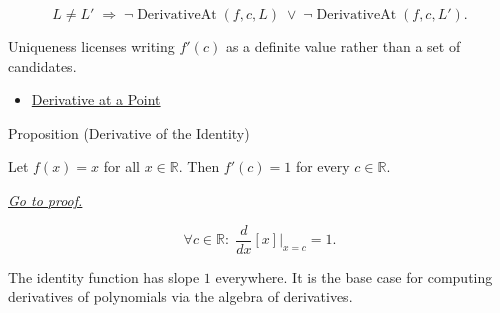 \begin{remark*}
\[
L \neq L'
\;\Longrightarrow\;
\neg\operatorname{DerivativeAt}(f,c,L)
\;\lor\;
\neg\operatorname{DerivativeAt}(f,c,L').
\]
\end{remark*}

\begin{remark*}[Interpretation]
Uniqueness licenses writing $f'(c)$ as a definite value rather than a set of candidates.
\end{remark*}

\begin{dependencies}
\begin{itemize}
  \item \hyperref[def:derivative-at-a-point]{Derivative at a Point}
\end{itemize}
\end{dependencies}


\begin{propositionbox}{Proposition (Derivative of the Identity)}
\begin{proposition}
\label{prop:derivative-of-the-identity}
Let $f(x) = x$ for all $x \in \mathbb{R}$. Then $f'(c) = 1$ for every $c \in \mathbb{R}$.

\smallskip\noindent
\hyperref[prf:derivative-of-the-identity]{\textit{Go to proof.}}
\end{proposition}
\end{propositionbox}

\begin{remark*}
\[
\forall c \in \mathbb{R}:\; \frac{d}{dx}[x]\big|_{x=c} = 1.
\]
\end{remark*}

\begin{remark*}[Interpretation]
The identity function has slope $1$ everywhere. It is the base case for computing derivatives of polynomials via the algebra of derivatives.
\end{remark*}

\NoLocalDependencies
